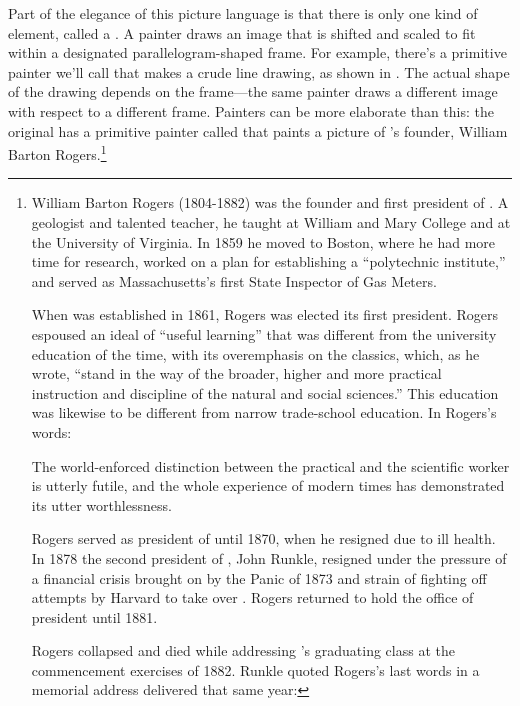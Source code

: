 Part of the elegance of this picture language is that there is only one kind of
element, called a .  A painter draws an image that is shifted
and scaled to fit within a designated parallelogram-shaped frame.  For example,
there's a primitive painter we'll call  that makes a crude line
drawing, as shown in .  The actual shape of the drawing
depends on the frame---the same  painter draws a different image
with respect to a different frame.  Painters can be more elaborate than this:
the original has a primitive painter called  that paints a picture
of 's founder, William Barton Rogers.\footnote{%
William Barton Rogers (1804-1882) was the founder
and first president of . A geologist and talented teacher, he
taught at William and Mary College and at the University of Virginia.  In 1859
he moved to Boston, where he had more time for research, worked on a plan for
establishing a ``polytechnic institute,'' and served as Massachusetts's first
State Inspector of Gas Meters.

When  was established in 1861, Rogers was elected its first
president.  Rogers espoused an ideal of ``useful learning'' that was different
from the university education of the time, with its overemphasis on the
classics, which, as he wrote, ``stand in the way of the broader, higher and
more practical instruction and discipline of the natural and social sciences.''
This education was likewise to be different from narrow trade-school education.
In Rogers's words:

\begin{quoteInFootnote}
The world-enforced distinction between the practical and the scientific worker
is utterly futile, and the whole experience of modern times has demonstrated
its utter worthlessness.
\end{quoteInFootnote}

Rogers served as president of  until 1870, when he resigned due to
ill health.  In 1878 the second president of , John Runkle,
resigned under the pressure of a financial crisis brought on by the Panic of
1873 and strain of fighting off attempts by Harvard to take over .
Rogers returned to hold the office of president until 1881.

Rogers collapsed and died while addressing 's graduating class at
the commencement exercises of 1882.  Runkle quoted Rogers's last words in a
memorial address delivered that same year:

}
